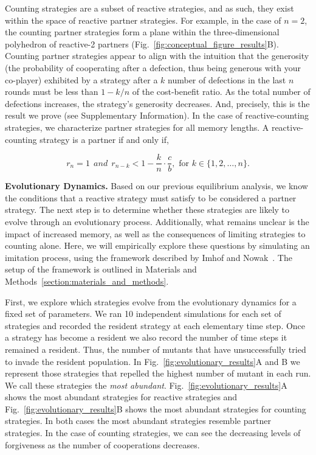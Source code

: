 \documentclass[11pt]{article}
\begin{document}
Counting strategies are a subset of reactive strategies, and as such, they exist
within the space of reactive partner strategies. For example, in the case of
$n=2$, the counting partner strategies form a plane within the three-dimensional
polyhedron of reactive-2 partners (Fig.~\ref{fig:conceptual_figure_results}B).
Counting partner strategies appear to align with the intuition that the
generosity (the probability of cooperating after a defection, thus being
generous with your co-player) exhibited by a strategy after a $k$ number of
defections in the last $n$ rounds must be less than $1 - k/n$ of the
cost-benefit ratio. As the total number of defections increases, the strategy's
generosity decreases. And, precisely, this is the result we prove (see
Supplementary Information). In the case of reactive-counting strategies, we
characterize partner strategies for all memory lengths. A reactive-counting
strategy is a partner if and only if,

\begin{equation}
  r_n = 1 ~~and~~ r_{n - k} < 1 - \frac{k}{n} \cdot \frac{c}{b}, \text{ for } k \in \{1, 2, \dots, n\}.
\end{equation}


\textbf{Evolutionary Dynamics.}
Based on our previous equilibrium analysis, we know the conditions that a
reactive strategy must satisfy to be considered a partner strategy. The next
step is to determine whether these strategies are likely to evolve through an
evolutionary process. Additionally, what remains unclear is the impact of
increased memory, as well as the consequences of limiting strategies to counting
alone. Here, we will empirically explore these questions by simulating an
imitation process, using the framework described by Imhof and
Nowak~\cite{imhof:royal:2010}. The setup of the framework is outlined in
Materials and Methods~\ref{section:materials_and_methods}.

First, we explore which strategies evolve from the evolutionary dynamics for a
fixed set of parameters. We ran 10 independent simulations for each set of
strategies and recorded the resident strategy at each elementary time step. Once
a strategy has become a resident we also record the number of time steps it
remained a resident. Thus, the number of mutants that have unsuccessfully tried
to invade the resident population. In Fig.~\ref{fig:evolutionary_results}A and B
we represent those strategies that repelled the highest number of mutant in each
run. We call these strategies the {\it most abundant}.
Fig.~\ref{fig:evolutionary_results}A shows the most abundant strategies for
reactive strategies and Fig.~\ref{fig:evolutionary_results}B shows the most
abundant strategies for counting strategies. In both cases the most abundant
strategies resemble partner strategies. In the case of counting strategies, we
can see the decreasing levels of forgiveness as the number of cooperations
decreases.
\end{document}
